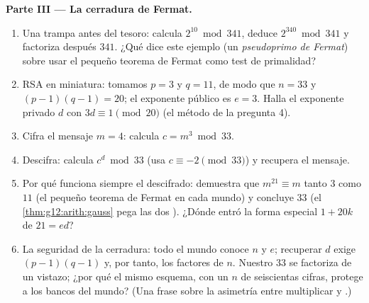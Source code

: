 \begin{problem}
\medskip
\noindent\textbf{Parte III --- La cerradura de Fermat.}
\begin{enumerate}[resume]
  \item Una trampa antes del tesoro: calcula $2^{10} \bmod 341$, deduce
        $2^{340} \bmod 341$ y factoriza después $341$. ¿Qué dice este
        ejemplo (un \emph{pseudoprimo de Fermat}) sobre usar el pequeño
        teorema de Fermat como test de primalidad?
  \item RSA en miniatura: tomamos $p = 3$ y $q = 11$, de modo que $n = 33$
        y $(p-1)(q-1) = 20$; el exponente público es $e = 3$. Halla el
        exponente privado $d$ con $3d \equiv 1 \pmod{20}$ (el método de la
        pregunta 4).
  \item Cifra el mensaje $m = 4$: calcula $c = m^3 \bmod 33$.
  \item Descifra: calcula $c^d \bmod 33$ (usa $c \equiv -2 \pmod{33}$) y
        recupera el mensaje.
  \item Por qué funciona siempre el descifrado: demuestra que
        $m^{21} \equiv m$ tanto  $3$ como  $11$ (el pequeño
        teorema de Fermat en cada mundo) y concluye  $33$ (el
        \cref{thm:g12:arith:gauss} pega las dos ). ¿Dónde entró
        la forma especial $1 + 20k$ de $21 = ed$?
  \item La seguridad de la cerradura: todo el mundo conoce $n$ y $e$;
        recuperar $d$ exige $(p-1)(q-1)$ y, por tanto, los factores de $n$.
        Nuestro $33$ se factoriza de un vistazo; ¿por qué el mismo esquema,
        con un $n$ de seiscientas cifras, protege a los bancos del mundo?
        (Una frase sobre la asimetría entre multiplicar y .)
\end{enumerate}


\end{problem}
